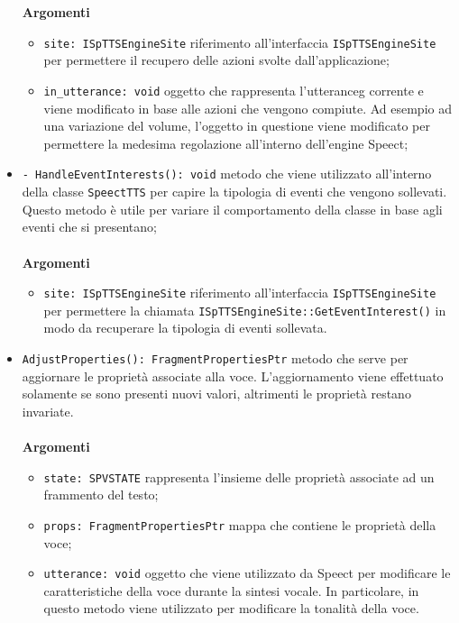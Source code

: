 \begin{itemize}
	\\\\
	\textbf{Argomenti}
	\begin{itemize}
		\item \texttt{site: ISpTTSEngineSite} riferimento all'interfaccia \texttt{ISpTTSEngineSite} per permettere il recupero delle azioni svolte dall'applicazione;
		\item \texttt{in\_utterance: void} oggetto che rappresenta l'\gls{utteranceg} corrente e  viene modificato in base alle azioni che vengono compiute. Ad esempio ad una variazione del volume, l'oggetto in questione viene modificato per permettere la medesima regolazione all'interno dell'engine Speect;
	\end{itemize}
	\item \texttt{- HandleEventInterests(): void} metodo che viene utilizzato all'interno della classe \texttt{SpeectTTS} per capire la tipologia di eventi che vengono sollevati. Questo metodo è utile per variare il comportamento della classe in base agli eventi che si presentano;\\\\
	\textbf{Argomenti}
	\begin{itemize}
		\item \texttt{site: ISpTTSEngineSite} riferimento all'interfaccia \texttt{ISpTTSEngineSite} per permettere la chiamata \texttt{ISpTTSEngineSite::GetEventInterest()} in modo da recuperare la tipologia di eventi sollevata.
	\end{itemize}
	\item \texttt{AdjustProperties(): FragmentPropertiesPtr} metodo che serve per aggiornare le proprietà associate alla voce. L'aggiornamento viene effettuato solamente se sono presenti nuovi valori, altrimenti le proprietà restano invariate.
	\\\\
	\textbf{Argomenti}
	\begin{itemize}
		\item \texttt{state: SPVSTATE} rappresenta l'insieme delle proprietà associate ad un frammento del testo;
		\item \texttt{props: FragmentPropertiesPtr} mappa che contiene le proprietà della voce;
		\item \texttt{utterance: void} oggetto che viene utilizzato da Speect per modificare le caratteristiche della voce durante la sintesi vocale. In particolare, in questo metodo viene utilizzato per modificare la tonalità della voce.
	\end{itemize} 		
\end{itemize}
